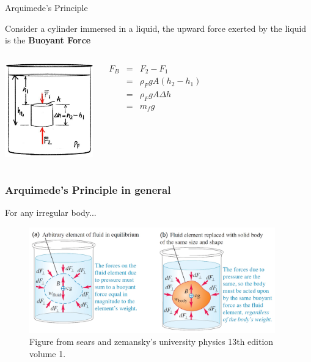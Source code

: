 \documentclass[]{beamer}
\begin{document}
\begin{frame}
  \textcolor{mypink1}{Arquimede's Principle}

  \vspace{5mm}
Consider a cylinder immersed in a liquid, the upward force exerted by the liquid is the \textbf{Buoyant Force}

\vspace{5mm}

\begin{columns}[c]
  \column{2in}  %
    \begin{center}
  \includegraphics[height=1.6in]{images2/Buoyance.jpg}
\end{center}

  \column{2in}
    \begin{eqnarray*}
      F_B&=&F_2-F_1\\
      &=&\rho_F g A (h_2-h_1)\\
      &=&\rho_F g A \Delta h\\
      &=&m_f g
    \end{eqnarray*}
  \end{columns}
\end{frame}

    


\begin{frame}
\frametitle{Arquimede's Principle in general }
For any irregular body...

  \begin{figure}
    \begin{center}
      \includegraphics[height=1.8in]{images2/Buoyance2b.jpg}
    \end{center}
    \caption{Figure from sears and zemansky's university physics 13th edition volume 1.}
  \end{figure}


  \end{frame}
\end{document}
